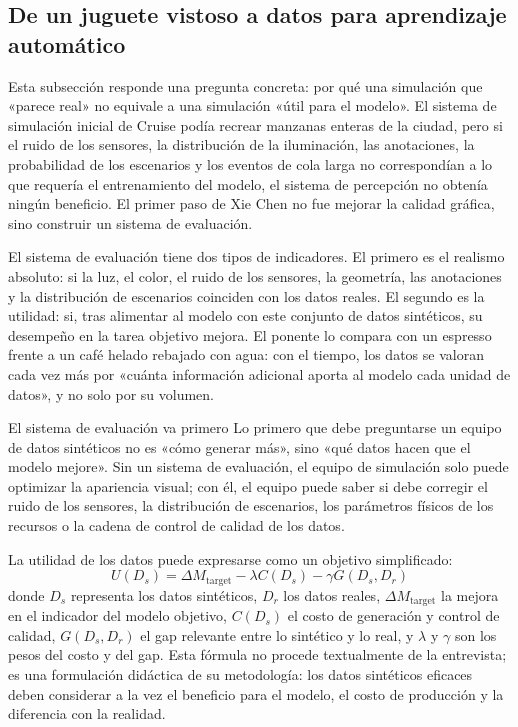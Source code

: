 \subsection{De un juguete vistoso a datos para aprendizaje automático}

Esta subsección responde una pregunta concreta: por qué una simulación que «parece real» no equivale a una simulación «útil para el modelo». El sistema de simulación inicial de Cruise podía recrear manzanas enteras de la ciudad, pero si el ruido de los sensores, la distribución de la iluminación, las anotaciones, la probabilidad de los escenarios y los eventos de cola larga no correspondían a lo que requería el entrenamiento del modelo, el sistema de percepción no obtenía ningún beneficio. El primer paso de Xie Chen no fue mejorar la calidad gráfica, sino construir un sistema de evaluación.

El sistema de evaluación tiene dos tipos de indicadores. El primero es el realismo absoluto: si la luz, el color, el ruido de los sensores, la geometría, las anotaciones y la distribución de escenarios coinciden con los datos reales. El segundo es la utilidad: si, tras alimentar al modelo con este conjunto de datos sintéticos, su desempeño en la tarea objetivo mejora. El ponente lo compara con un espresso frente a un café helado rebajado con agua: con el tiempo, los datos se valoran cada vez más por «cuánta información adicional aporta al modelo cada unidad de datos», y no solo por su volumen.

\begin{importantbox}{El sistema de evaluación va primero}
Lo primero que debe preguntarse un equipo de datos sintéticos no es «cómo generar más», sino «qué datos hacen que el modelo mejore». Sin un sistema de evaluación, el equipo de simulación solo puede optimizar la apariencia visual; con él, el equipo puede saber si debe corregir el ruido de los sensores, la distribución de escenarios, los parámetros físicos de los recursos o la cadena de control de calidad de los datos.
\end{importantbox}

La utilidad de los datos puede expresarse como un objetivo simplificado:
\[
U(D_s)=\Delta M_{\mathrm{target}}-\lambda C(D_s)-\gamma G(D_s,D_r)
\]
donde $D_s$ representa los datos sintéticos, $D_r$ los datos reales, $\Delta M_{\mathrm{target}}$ la mejora en el indicador del modelo objetivo, $C(D_s)$ el costo de generación y control de calidad, $G(D_s,D_r)$ el gap relevante entre lo sintético y lo real, y $\lambda$ y $\gamma$ son los pesos del costo y del gap. Esta fórmula no procede textualmente de la entrevista; es una formulación didáctica de su metodología: los datos sintéticos eficaces deben considerar a la vez el beneficio para el modelo, el costo de producción y la diferencia con la realidad.

